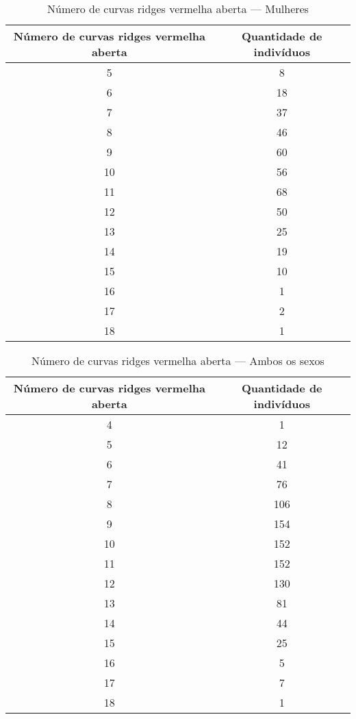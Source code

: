 \documentclass[a4paper,12pt]{article}
\begin{document}
\begin{table}[h!]
\centering
\caption{Número de curvas ridges vermelha aberta — Mulheres}
\begin{tabular}{c c}
\hline
\textbf{Número de curvas ridges vermelha aberta} & \textbf{Quantidade de indivíduos} \\ 
\hline
5  & 8   \\
6  & 18  \\
7  & 37  \\
8  & 46  \\
9  & 60  \\
10 & 56  \\
11 & 68  \\
12 & 50  \\
13 & 25  \\
14 & 19  \\
15 & 10  \\
16 & 1   \\
17 & 2   \\
18 & 1   \\
\hline
\end{tabular}
\end{table}


\begin{table}[h!]
\centering
\caption{Número de curvas ridges vermelha aberta — Ambos os sexos}
\begin{tabular}{c c}
\hline
\textbf{Número de curvas ridges vermelha aberta} & \textbf{Quantidade de indivíduos} \\ 
\hline
4  & 1    \\
5  & 12   \\
6  & 41   \\
7  & 76   \\
8  & 106  \\
9  & 154  \\
10 & 152  \\
11 & 152  \\
12 & 130  \\
13 & 81   \\
14 & 44   \\
15 & 25   \\
16 & 5    \\
17 & 7    \\
18 & 1    \\
\hline
\end{tabular}
\end{table}
\end{document}

